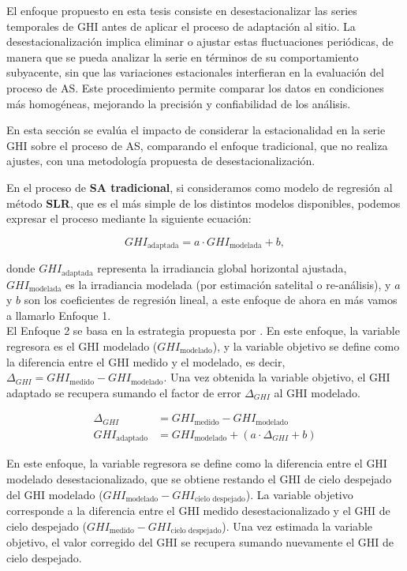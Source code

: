 El enfoque propuesto en esta tesis consiste en desestacionalizar las series temporales de GHI antes de aplicar el proceso de adaptación al sitio. La desestacionalización implica eliminar o ajustar estas fluctuaciones periódicas, de manera que se pueda analizar la serie en términos de su comportamiento subyacente, sin que las variaciones estacionales interfieran en la evaluación del proceso de AS. Este procedimiento permite comparar los datos en condiciones más homogéneas, mejorando la precisión y confiabilidad de los análisis.

En esta sección se evalúa el impacto de considerar la estacionalidad en la serie GHI sobre el proceso de AS, comparando el enfoque tradicional, que no realiza ajustes, con una metodología propuesta de desestacionalización.


En el proceso de \textbf{SA tradicional}, si consideramos como modelo de regresión al método \textbf{SLR}, que es el más simple de los distintos modelos disponibles, podemos expresar el proceso mediante la siguiente ecuación:

\begin{equation}
GHI_{\text{adaptada}} = a \cdot GHI_{\text{modelada}} + b,
\label{ec:approache1}
\end{equation}

donde \(GHI_{\text{adaptada}}\) representa la irradiancia global horizontal ajustada, \(GHI_{\text{modelada}}\) es la irradiancia modelada (por estimación satelital o re-análisis), y \(a\) y \(b\) son los coeficientes de regresión lineal, a este enfoque de ahora en más vamos a llamarlo Enfoque 1.\\

El Enfoque 2 se basa en la estrategia propuesta por \cite{ZAINALI2024}. En este enfoque, la variable regresora es el GHI modelado ($GHI_{\text{modelado}}$), y la variable objetivo se define como la diferencia entre el GHI medido y el modelado, es decir, 
$\Delta_{GHI} = GHI_{\text{medido}} - GHI_{\text{modelado}}$. Una vez obtenida la variable objetivo, el GHI adaptado se recupera sumando el factor de error $\Delta_{GHI}$ al GHI modelado.

\begin{align}
\Delta_{GHI} &= GHI_{\text{medido}} - GHI_{\text{modelado}} \\
GHI_{\text{adaptado}} &= GHI_{\text{modelado}} + (a \cdot \Delta_{GHI} + b)
\label{eq:approach2}
\end{align}


En este enfoque, la variable regresora se define como la diferencia entre el GHI modelado desestacionalizado, que se obtiene restando el GHI de cielo despejado del GHI modelado ($GHI_{\text{modelado}} - GHI_{\text{cielo despejado}}$). La variable objetivo corresponde a la diferencia entre el GHI medido desestacionalizado y el GHI de cielo despejado ($GHI_{\text{medido}} - GHI_{\text{cielo despejado}}$). Una vez estimada la variable objetivo, el valor corregido del GHI se recupera sumando nuevamente el GHI de cielo despejado.

